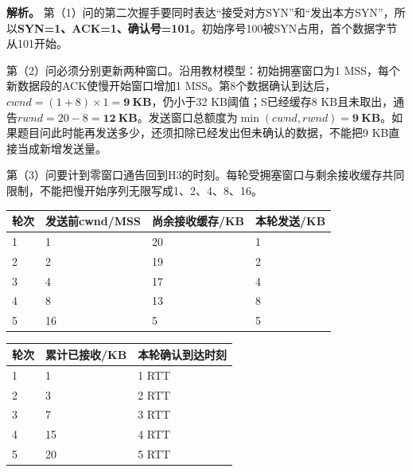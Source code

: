 \textbf{解析。} 第（1）问的第二次握手要同时表达``接受对方SYN''和``发出本方SYN''，所以\textbf{SYN=1、ACK=1、确认号=101}。初始序号100被SYN占用，首个数据字节从101开始。

第（2）问必须分别更新两种窗口。沿用教材模型：初始拥塞窗口为1 MSS，每个新数据段的ACK使慢开始窗口增加1 MSS。第8个数据确认到达后，\(cwnd=(1+8)\times1=\mathbf{9\ KB}\)，仍小于32 KB阈值；S已经缓存8 KB且未取出，通告\(rwnd=20-8=\mathbf{12\ KB}\)。发送窗口总额度为\(\min(cwnd,rwnd)=\mathbf{9\ KB}\)。如果题目问此时能再发送多少，还须扣除已经发出但未确认的数据，不能把9 KB直接当成新增发送量。

第（3）问要计到零窗口通告回到H3的时刻。每轮受拥塞窗口与剩余接收缓存共同限制，不能把慢开始序列无限写成1、2、4、8、16。

\begin{wideblock}

\par\medskip\noindent\begin{minipage}{\linewidth}\fontsize{9.3}{12}\selectfont\begin{tabularx}{\linewidth}{@{}YYYY@{}}
\toprule\noalign{}
轮次 & 发送前cwnd/MSS & 尚余接收缓存/KB & 本轮发送/KB \\
\midrule\noalign{}


1 & 1 & 20 & 1 \\
2 & 2 & 19 & 2 \\
3 & 4 & 17 & 4 \\
4 & 8 & 13 & 8 \\
5 & 16 & 5 & 5 \\
\bottomrule\end{tabularx}
\end{minipage}\par\medskip

\end{wideblock}

\begin{wideblock}

\par\medskip\noindent\begin{minipage}{\linewidth}\fontsize{9.3}{12}\selectfont\begin{tabularx}{\linewidth}{@{}YYY@{}}
\toprule\noalign{}
轮次 & 累计已接收/KB & 本轮确认到达时刻 \\
\midrule\noalign{}


1 & 1 & 1 RTT \\
2 & 3 & 2 RTT \\
3 & 7 & 3 RTT \\
4 & 15 & 4 RTT \\
5 & 20 & 5 RTT \\
\bottomrule\end{tabularx}
\end{minipage}\par\medskip

\end{wideblock}

